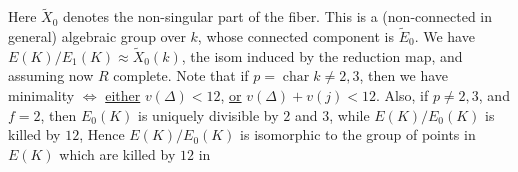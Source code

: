 Here $\widetilde X_0$ denotes the non-singular part of the fiber. This is a (non-connected in general) algebraic group over $k$, whose connected component is $\widetilde E_0$. We have $E(K)/E_1(K)\approx\widetilde X_0(k)$, the isom induced by the reduction map, and assuming now $R$ complete. Note that if $p=\operatorname{char} k\ne2,3$, then we have minimality $\Longleftrightarrow$ \uline{either} $v(\Delta)<12$, \uline{or} $v(\Delta)+v(j)<12$. Also, if $p\ne2,3$, and $f=2$, then $E_0(K)$ is uniquely divisible by $2$ and $3$, while $E(K)/E_0(K)$ is killed by $12$, Hence $E(K)/E_0(K)$ is isomorphic to the group of points in $E(K)$ which are killed by $12$ in %
\clearpage
